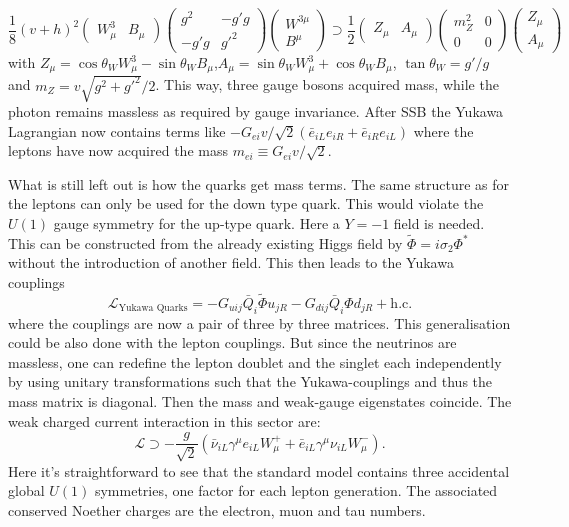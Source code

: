\begin{equation}
\frac{1}{8}(v+h)^2\begin{pmatrix}
W^3_\mu &B_\mu
\end{pmatrix}
\begin{pmatrix}
g^2&-g'g\\
-g'g&g'^2
\end{pmatrix}
\begin{pmatrix}
W^{3\mu}\\
B^\mu
\end{pmatrix}\supset	\frac{1}{2}
\begin{pmatrix}
Z_\mu&A_\mu
\end{pmatrix}
\begin{pmatrix}
m_Z^2&0\\
0&0
\end{pmatrix}
\begin{pmatrix}
Z_\mu\\A_\mu
\end{pmatrix}
\end{equation}
with $Z_\mu = \cos \theta_W W^3_\mu-\sin\theta_W B_\mu$,$A_\mu = \sin \theta_W W^3_\mu+\cos\theta_W B_\mu$, $\tan \theta_W=g'/g$ and $m_Z=v\sqrt{g^2+g'^2}/2$. This way, three gauge bosons acquired mass, while the photon remains massless as required by gauge invariance.
After SSB the Yukawa Lagrangian now contains terms like $-G_{ei}v/\sqrt{2}(\bar{e}_{iL}e_{iR}+\bar{e}_{iR}e_{iL})$ where the leptons have now acquired the mass $m_{ei}\equiv G_{ei}v/\sqrt{2}$.

What is still left out is how the quarks get mass terms. The same structure as for the leptons can only be used for the down type quark. This would violate the $U(1)$ gauge symmetry for the up-type quark. Here a $Y=-1$ field is needed. This can be constructed from the already existing Higgs field by $\widetilde{\Phi}=i\sigma_2\Phi^*$ without the introduction of another field. This then leads to the Yukawa couplings
\begin{equation}
\mathcal{L}_\text{Yukawa Quarks} = -G_{uij}\bar{Q}_i\widetilde{\Phi}u_{jR}-G_{dij}\bar{Q}_i\Phi d_{jR}+ \text{h.c.}
\end{equation} 
where the couplings are now a pair of three by three matrices. This generalisation could be also done with the lepton couplings. But since the neutrinos are massless, one can redefine the lepton doublet and the singlet each independently by using unitary transformations such that the Yukawa-couplings and thus the mass matrix is diagonal. Then the mass and weak-gauge eigenstates coincide. The weak charged current interaction in this sector are:
\begin{equation}
\mathcal{L}\supset-\frac{g}{\sqrt{2}}\left(\bar{\nu}_{iL}\gamma^\mu e_{iL} W_\mu^+ +\bar{e}_{iL}\gamma^\mu\nu_{iL} W_\mu^-\right).
\end{equation}
Here it's straightforward to see that the standard model contains three accidental global $U(1)$ symmetries, one factor for each lepton generation. The associated conserved Noether charges are the electron, muon and tau numbers.

